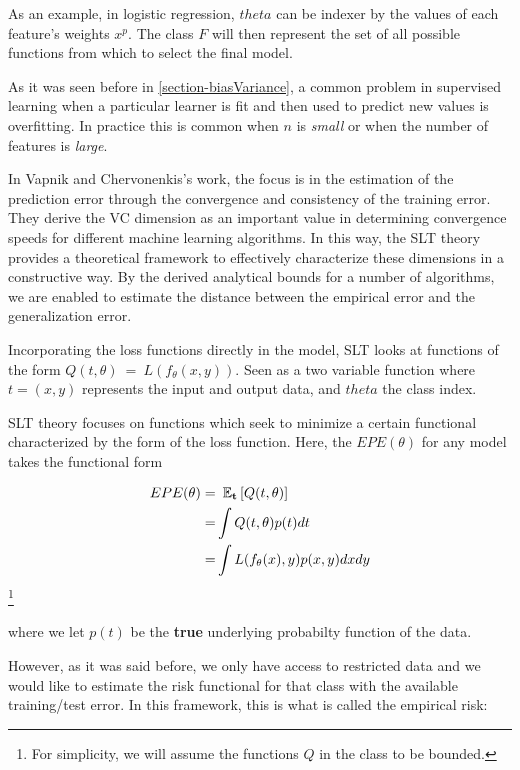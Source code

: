 As an example, in logistic regression, $theta$ can be indexer by the values of each feature's weights $x^p$. The class $F$ will then represent the set of all possible functions from which to select the final model.

As it was seen before in \ref{section-biasVariance}, a common problem in supervised learning when a particular learner is fit and then used to predict new values is overfitting. In practice this is common when $n$ is \textit{small} or when the number of features is \textit{large}.

In Vapnik and Chervonenkis's work, the focus is in the estimation of the prediction error through the convergence and consistency of the training error. They derive the VC dimension as an important value in determining convergence speeds for different machine learning algorithms. In this way, the SLT theory provides a theoretical framework to effectively characterize these dimensions in a constructive way. By the derived analytical bounds for a number of algorithms, we are enabled to estimate the distance between the empirical error and the generalization error.

Incorporating the loss functions directly in the model, SLT looks at functions of the form $Q(t,\theta) \ = \ L(f_\theta(x,y))$. Seen as a two variable function where $t=(x,y)$ represents the input and output data, and $theta$ the class index.

SLT theory focuses on functions which seek to minimize a certain functional characterized by the form of the loss function. Here, the $EPE(\theta)$ for any model takes the functional form

\begin{equation}\label{vapnik-risk}
\begin{split}
EPE(\theta) = & \ \operatorname{\mathbb{E}}_{\textbf{t}} \left[  Q(t,\theta) \right]\\
= & \int Q(t,\theta) p(t) dt  \\
= & \int L(f_\theta(x),y) p(x,y) dx dy
\end{split}
\end{equation}\footnote{For simplicity, we will assume the functions $Q$ in the class to be bounded.}

where we let $p(t)$ be the \textbf{true} underlying probabilty function of the data.

However, as it was said before, we only have access to restricted data and we would like to estimate the risk functional for that class with the available training/test error. In this framework, this is what is called the empirical risk:

